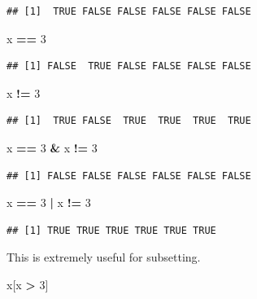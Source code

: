 \documentclass[]{book}
\newenvironment{Shaded}{\begin{snugshade}}{\end{snugshade}}
\newcommand{\DecValTok}[1]{\textcolor[rgb]{0.00,0.00,0.81}{#1}}
\newcommand{\StringTok}[1]{\textcolor[rgb]{0.31,0.60,0.02}{#1}}
\newcommand{\OperatorTok}[1]{\textcolor[rgb]{0.81,0.36,0.00}{\textbf{#1}}}
\newcommand{\NormalTok}[1]{#1}
\theoremstyle{definition}
\theoremstyle{definition}
\theoremstyle{definition}
\theoremstyle{remark}
\begin{document}
\begin{verbatim}
## [1]  TRUE FALSE FALSE FALSE FALSE FALSE
\end{verbatim}

\begin{Shaded}
\begin{Highlighting}[]
\NormalTok{x }\OperatorTok{==}\StringTok{ }\DecValTok{3}
\end{Highlighting}
\end{Shaded}

\begin{verbatim}
## [1] FALSE  TRUE FALSE FALSE FALSE FALSE
\end{verbatim}

\begin{Shaded}
\begin{Highlighting}[]
\NormalTok{x }\OperatorTok{!=}\StringTok{ }\DecValTok{3}
\end{Highlighting}
\end{Shaded}

\begin{verbatim}
## [1]  TRUE FALSE  TRUE  TRUE  TRUE  TRUE
\end{verbatim}

\begin{Shaded}
\begin{Highlighting}[]
\NormalTok{x }\OperatorTok{==}\StringTok{ }\DecValTok{3} \OperatorTok{&}\StringTok{ }\NormalTok{x }\OperatorTok{!=}\StringTok{ }\DecValTok{3}
\end{Highlighting}
\end{Shaded}

\begin{verbatim}
## [1] FALSE FALSE FALSE FALSE FALSE FALSE
\end{verbatim}

\begin{Shaded}
\begin{Highlighting}[]
\NormalTok{x }\OperatorTok{==}\StringTok{ }\DecValTok{3} \OperatorTok{|}\StringTok{ }\NormalTok{x }\OperatorTok{!=}\StringTok{ }\DecValTok{3}
\end{Highlighting}
\end{Shaded}

\begin{verbatim}
## [1] TRUE TRUE TRUE TRUE TRUE TRUE
\end{verbatim}

This is extremely useful for subsetting.

\begin{Shaded}
\begin{Highlighting}[]
\NormalTok{x[x }\OperatorTok{>}\StringTok{ }\DecValTok{3}\NormalTok{]}
\end{Highlighting}
\end{Shaded}
\end{document}
